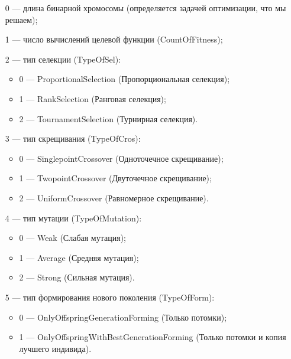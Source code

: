 \documentclass[a4paper,12pt]{article}
\begin{document}
 \begin{itemize}
 \item [0] --- длина бинарной хромосомы (определяется задачей оптимизации, что мы решаем);
 
 \item [1] --- число вычислений целевой функции (CountOfFitness);
 
 \item [2] --- тип селекции (TypeOfSel):
 
 \begin{itemize}
       \item 0 --- ProportionalSelection (Пропорциональная селекция);
 
       \item 1 --- RankSelection (Ранговая селекция);
 
       \item 2 --- TournamentSelection (Турнирная селекция).
	    \end{itemize}
 
 \item [3] --- тип скрещивания (TypeOfCros):
  \begin{itemize}
       \item 0 --- SinglepointCrossover (Одноточечное скрещивание);
 
       \item 1 --- TwopointCrossover (Двуточечное скрещивание);
 
       \item 2 --- UniformCrossover (Равномерное скрещивание).
	    \end{itemize}
 
 \item [4] --- тип мутации (TypeOfMutation):
  \begin{itemize}
       \item 0 --- Weak (Слабая мутация);
 
       \item 1 --- Average (Средняя мутация);
 
       \item 2 --- Strong (Сильная мутация).
	    \end{itemize}
 
 \item [5] --- тип формирования нового поколения (TypeOfForm):
  \begin{itemize}
       \item 0 --- OnlyOffspringGenerationForming (Только потомки);
 
       \item 1 --- OnlyOffspringWithBestGenerationForming (Только потомки и копия лучшего индивида).
	    \end{itemize}
 \end{itemize}
 
\end{document}
